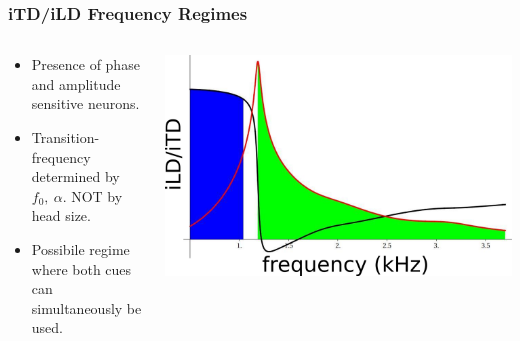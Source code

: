 \documentclass{beamer}
\begin{document}
\begin{frame}
\frametitle{iTD/iLD Frequency Regimes}
\begin{columns}
\begin{column}{0.5\textwidth}
\begin{exampleblock}{}
\small
 \begin{itemize}
 \item Presence of phase and amplitude sensitive neurons.
  \item Transition-frequency determined by $f_0,\ \alpha$. NOT by head size.
  \item Possibile regime where both cues can simultaneously be used.
 \end{itemize}
\end{exampleblock}
\end{column}
     \begin{column}{0.5\textwidth}
      \includegraphics[width = 6 cm]{Diagrams/Presentation/tokayregions.png}
\end{column}
\end{columns}
\end{frame}
\end{document}
